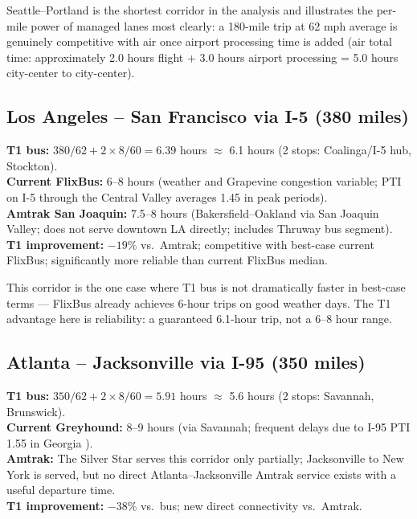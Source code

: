 Seattle--Portland is the shortest corridor in the analysis and illustrates the per-mile power of managed lanes most clearly: a 180-mile trip at 62 mph average is genuinely competitive with air once airport processing time is added (air total time: approximately 2.0 hours flight + 3.0 hours airport processing = 5.0 hours city-center to city-center).

\subsection{Los Angeles -- San Francisco via I-5 (380 miles)}

\textbf{T1 bus:} $380 / 62 + 2 \times 8/60 = 6.39$ hours $\approx$ 6.1 hours (2 stops: Coalinga/I-5 hub, Stockton). \\
\textbf{Current FlixBus:} 6--8 hours (weather and Grapevine congestion variable; PTI on I-5 through the Central Valley averages 1.45 in peak periods). \\
\textbf{Amtrak San Joaquin:} 7.5--8 hours (Bakersfield--Oakland via San Joaquin Valley; does not serve downtown LA directly; includes Thruway bus segment). \\
\textbf{T1 improvement:} $-19\%$ vs.\ Amtrak; competitive with best-case current FlixBus; significantly more reliable than current FlixBus median.

This corridor is the one case where T1 bus is not dramatically faster in best-case terms --- FlixBus already achieves 6-hour trips on good weather days. The T1 advantage here is reliability: a guaranteed 6.1-hour trip, not a 6--8 hour range.

\subsection{Atlanta -- Jacksonville via I-95 (350 miles)}

\textbf{T1 bus:} $350 / 62 + 2 \times 8/60 = 5.91$ hours $\approx$ 5.6 hours (2 stops: Savannah, Brunswick). \\
\textbf{Current Greyhound:} 8--9 hours (via Savannah; frequent delays due to I-95 PTI 1.55 in Georgia \citep{FHWA_freight2023}). \\
\textbf{Amtrak:} The Silver Star serves this corridor only partially; Jacksonville to New York is served, but no direct Atlanta--Jacksonville Amtrak service exists with a useful departure time. \\
\textbf{T1 improvement:} $-38\%$ vs.\ bus; new direct connectivity vs.\ Amtrak.


